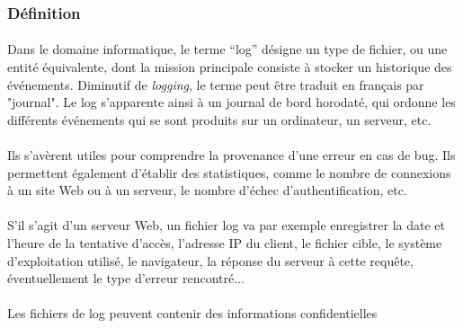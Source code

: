 \subsubsection*{Définition}

\paragraph{} Dans le domaine informatique, le terme ``log'' désigne un type de
fichier, ou une entité équivalente, dont la mission principale consiste à
stocker un historique des événements. Diminutif de \textit{logging}, le terme
peut être traduit en français par "journal". Le log s'apparente ainsi à un
journal de bord horodaté, qui ordonne les différents événements qui se sont
produits sur un ordinateur, un serveur, etc.

\paragraph{} Ils s'avèrent utiles pour comprendre la provenance d'une erreur en
cas de bug. Ils permettent également d'établir des statistiques, comme le
nombre de connexions à un site Web ou à un serveur, le nombre d'échec
d'authentification, etc.

\paragraph{} S'il s'agit d'un serveur Web, un fichier log va par exemple
enregistrer la date et l'heure de la tentative d'accès, l'adresse IP du client,
le fichier cible, le système d'exploitation utilisé, le navigateur, la réponse
du serveur à cette requête, éventuellement le type d'erreur rencontré...

\paragraph{} Les fichiers de log peuvent contenir des informations
confidentielles
